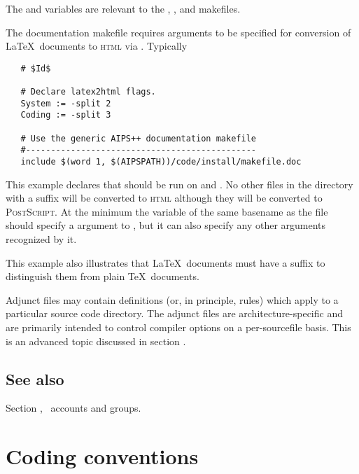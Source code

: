 \noindent
The  and  variables are relevant to the
, , and  makefiles.

The documentation makefile requires arguments to be specified for conversion
of \LaTeX\ documents to \textsc{html} via .  Typically

\begin{verbatim}
   # $Id$
 
   # Declare latex2html flags.
   System := -split 2
   Coding := -split 3
 
   # Use the generic AIPS++ documentation makefile
   #----------------------------------------------
   include $(word 1, $(AIPSPATH))/code/install/makefile.doc
\end{verbatim}

\noindent
This example declares that  should be run on
 and .  No other files in the directory
with a  suffix will be converted to \textsc{html} although they
will be converted to \textsc{PostScript}.  At the minimum the variable of
the same basename as the  file should specify a 
argument to , but it can also specify any other arguments
recognized by it.

This example also illustrates that \LaTeX\ documents must have a 
suffix to distinguish them from plain \TeX\ documents.

Adjunct  files may contain definitions (or, in principle,
rules) which apply to a particular source code directory.  The adjunct files
are architecture-specific and are primarily intended to control compiler
options on a per-sourcefile basis.  This is an advanced topic discussed in
section .

\subsection*{See also}

Section , \aipspp\ accounts and groups.


\newpage
\section{Coding conventions}
\label{Coding conventions}

